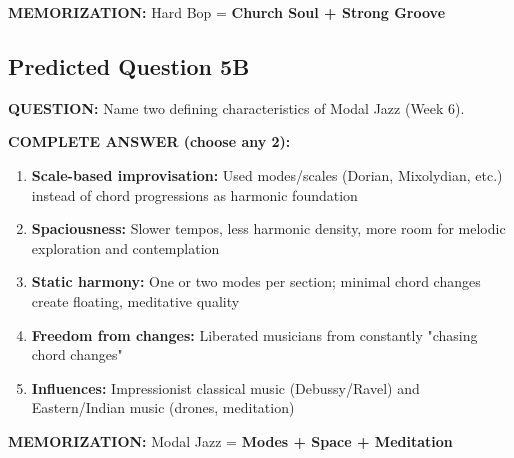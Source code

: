 \documentclass[11pt]{article}
\begin{document}
\textbf{MEMORIZATION:} Hard Bop = \textbf{\textcolor{hardbop}{Church Soul + Strong Groove}}

\subsection*{Predicted Question 5B}

\begin{mdframed}[backgroundcolor=questioncolor!10, linewidth=2pt]
\textbf{\textcolor{questioncolor}{QUESTION:}} Name two defining characteristics of Modal Jazz (Week 6).
\end{mdframed}

\begin{mdframed}[backgroundcolor=answercolor!10, linewidth=2pt]
\textbf{\textcolor{answercolor}{COMPLETE ANSWER (choose any 2):}}

\begin{enumerate}[leftmargin=*, nosep]
    \item \textbf{Scale-based improvisation:} Used modes/scales (Dorian, Mixolydian, etc.) instead of chord progressions as harmonic foundation
    
    \item \textbf{Spaciousness:} Slower tempos, less harmonic density, more room for melodic exploration and contemplation
    
    \item \textbf{Static harmony:} One or two modes per section; minimal chord changes create floating, meditative quality
    
    \item \textbf{Freedom from changes:} Liberated musicians from constantly "chasing chord changes"
    
    \item \textbf{Influences:} Impressionist classical music (Debussy/Ravel) and Eastern/Indian music (drones, meditation)
\end{enumerate}

\vspace{5pt}
\end{mdframed}

\textbf{MEMORIZATION:} Modal Jazz = \textbf{\textcolor{modal}{Modes + Space + Meditation}}
\end{document}
